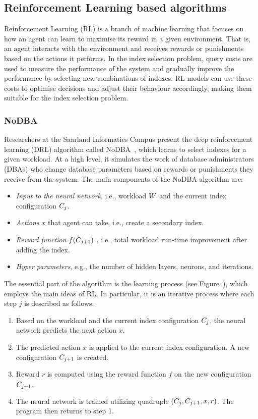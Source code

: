 \subsection{Reinforcement Learning based algorithms}
Reinforcement Learning (RL) is a branch of machine learning that focuses on how an agent can learn to maximise its reward in a given environment. That is, an agent interacts with the environment and receives rewards or punishments based on the actions it performs. In the index selection problem, query costs are used to measure the performance of the system and gradually improve the performance by selecting new combinations of indexes. RL models can use these costs to optimise decisions and adjust their behaviour accordingly, making them suitable for the index selection problem.

\subsubsection{NoDBA}
Researchers at the Saarland Informatics Campus present the deep reinforcement learning (DRL) algorithm called NoDBA~\citep{DRL}, which learns to select indexes for a given workload. At a high level, it simulates the work of database administrators (DBAs) who change database parameters based on rewards or punishments they receive from the system. The main components of the NoDBA algorithm are:
\begin{itemize}
    \item \textit{Input to the neural network}, i.e., workload $W$ and the current index configuration $C_{j}$.
    \item \textit{Actions} $x$ that agent can take, i.e., create a secondary index.
    \item \textit{Reward function} $f(C_{j+1})$ , i.e., total workload run-time improvement after adding the index.
    \item \textit{Hyper parameters}, e.g., the number of hidden layers, neurons, and iterations.
\end{itemize}

The essential part of the algorithm is the learning process (see Figure~), which employs the main ideas of RL. In particular, it is an iterative process where each step $j$ is described as follows:
\begin{enumerate}
    \item Based on the workload and the current index configuration $C_{j}$, the neural network predicts the next action $x$.
    \item The predicted action $x$ is applied to the current index configuration. A new configuration $C_{j+1}$ is created.
    \item Reward $r$ is computed using the reward function $f$ on the new configuration $C_{j+1}$.
    \item The neural network is trained utilizing quadruple $(C_{j}, C_{j+1}, x, r)$. The program then returns to step 1.
\end{enumerate}

